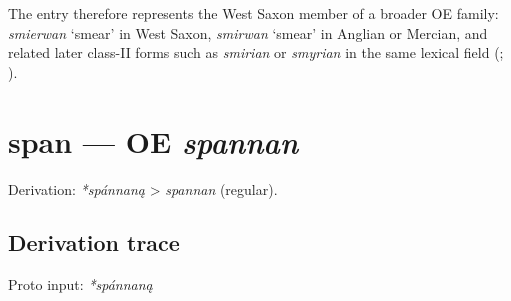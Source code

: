\documentclass[
  british,
  a4paper,
  openany]{book}
\providecommand{\texorpdfstring}[2]{#1}
\begin{document}
The entry therefore represents the West Saxon member of a broader OE
family: {\emph{smierwan}} `smear' in West Saxon, {\emph{smirwan}}
`smear' in Anglian or Mercian, and related later class-II forms such as
\emph{smirian} or \emph{smyrian} in the same lexical field
(;
).

\section{\texorpdfstring{span --- OE
\emph{spannan}}{span --- OE spannan}}\label{span-oe-spannan}


Derivation: \emph{*spánnaną} \textgreater{} \emph{spannan} (regular).

\subsection{Derivation trace}\label{derivation-trace-48}

Proto input: \emph{*spánnaną}

\begingroup
\setlength{\fboxsep}{6pt}
\end{document}
